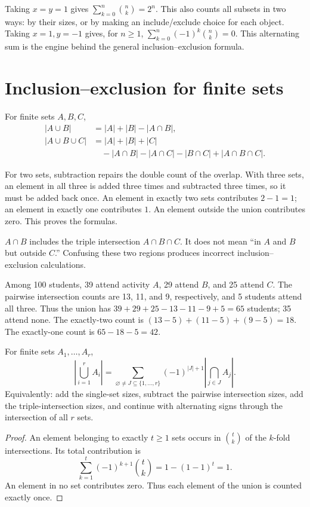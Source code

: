 Taking $x=y=1$ gives $\sum_{k=0}^n\binom nk=2^n$. This also counts all
subsets in two ways: by their sizes, or by making an include/exclude
choice for each object. Taking $x=1,y=-1$ gives, for $n\ge1$,
$\sum_{k=0}^n(-1)^k\binom nk=0$. This alternating sum is the engine
behind the general inclusion--exclusion formula.

\section{Inclusion--exclusion for finite sets}

\begin{proposition}
For finite sets $A,B,C$,
\begin{align*}
|A\cup B|&=|A|+|B|-|A\cap B|,\\
|A\cup B\cup C|&=|A|+|B|+|C|\\
&\quad-|A\cap B|-|A\cap C|-|B\cap C|
  +|A\cap B\cap C|.
\end{align*}
\end{proposition}

For two sets, subtraction repairs the double count of the overlap. With
three sets, an element in all three is added three times and subtracted
three times, so it must be added back once. An element in exactly two
sets contributes $2-1=1$; an element in exactly one contributes $1$.
An element outside the union contributes zero. This proves the formulas.

\begin{warningbox}
$A\cap B$ includes the triple intersection $A\cap B\cap C$.
It does not mean ``in $A$ and $B$ but outside $C$.'' Confusing these
two regions produces incorrect inclusion--exclusion calculations.
\end{warningbox}

\begin{example}
Among 100 students, 39 attend activity $A$, 29 attend $B$, and 25 attend
$C$. The pairwise intersection counts are 13, 11, and 9, respectively,
and 5 students attend all three. Thus the union has
$39+29+25-13-11-9+5=65$ students; 35 attend none.
The exactly-two count is $(13-5)+(11-5)+(9-5)=18$.
The exactly-one count is $65-18-5=42$.
\end{example}

\begin{theorem}
For finite sets $A_1,\ldots,A_r$,
\[
\left|\bigcup_{i=1}^r A_i\right|
=\sum_{\varnothing\ne J\subseteq\{1,\ldots,r\}}
 (-1)^{|J|+1}\left|\bigcap_{j\in J}A_j\right|.
\]
Equivalently: add the single-set sizes, subtract the pairwise
intersection sizes, add the triple-intersection sizes, and continue
with alternating signs through the intersection of all $r$ sets.
\end{theorem}
\begin{proof}
An element belonging to exactly $t\ge1$ sets occurs in
$\binom tk$ of the $k$-fold intersections. Its total contribution is
\[
\sum_{k=1}^t(-1)^{k+1}\binom tk=1-(1-1)^t=1.
\]
An element in no set contributes zero. Thus each element of the union
is counted exactly once.
\end{proof}

